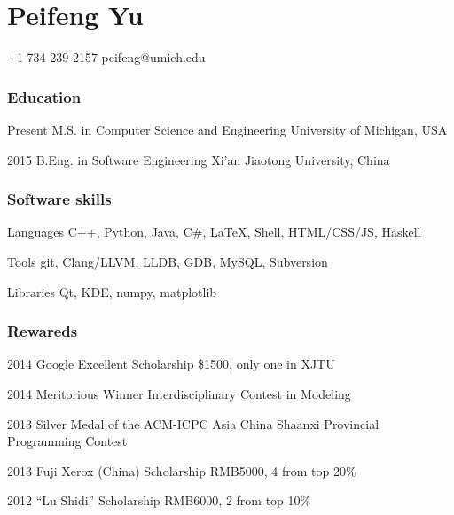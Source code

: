\documentclass{tccv}
\begin{document}
\part{Peifeng Yu}

    {+1 734 239 2157}
    {peifeng@umich.edu}

\section{Education}

\begin{yearlist}

\item{Present}
     {M.S. in Computer Science and \newline Engineering}
     {University of Michigan, USA}

\item{2015}
     {B.Eng. in Software Engineering}
     {Xi'an Jiaotong University, China}

\end{yearlist}


\section{Software skills}

\begin{factlist}

\item{Languages}
     {C++, Python, Java, C\#, \LaTeX, Shell, HTML/CSS/JS, Haskell}

\item{Tools}
     {git, Clang/LLVM, LLDB, GDB, MySQL, Subversion}

\item{Libraries}
     {Qt, KDE, numpy, matplotlib}
\end{factlist}

\section{Rewareds}

\begin{yearlist}
    \item{2014}
         {Google Excellent Scholarship}
         {\$1500, only one in XJTU}
    \item{2014}
         {Meritorious Winner}
         {Interdisciplinary Contest in Modeling}
    \item{2013}
         {Silver Medal of the ACM-ICPC}
         {Asia China Shaanxi Provincial Programming Contest}
    \item{2013}
         {Fuji Xerox (China) Scholarship}
         {RMB5000, 4 from top 20\%}
    \item{2012}
         {``Lu Shidi'' Scholarship}
         {RMB6000, 2 from top 10\%}
\end{yearlist}
\end{document}
